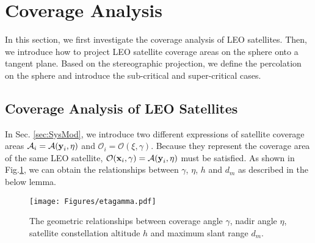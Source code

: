 \documentclass[final]{IEEEtran}
\begin{document}
\section{Coverage Analysis} \label{sec:coverage}
\indent In this section, we first investigate the coverage analysis of LEO satellites. Then, we introduce how to project LEO satellite coverage areas on the sphere onto a tangent plane. Based on the stereographic projection, we define the percolation on the sphere and introduce the sub-critical and super-critical cases.

\subsection{Coverage Analysis of LEO Satellites}
\indent In Sec. \ref{sec:SysMod}, we introduce two different expressions of satellite coverage areas $\mathcal{A}_i=\mathcal{A}(\textbf{y}_i,\eta)$ and $\mathcal{O}_i=\mathcal{O}(\xi,\gamma)$. Because they represent the coverage area of the same LEO satellite, $\mathcal{O}(\textbf{x}_i,\gamma)=\mathcal{A}(\textbf{y}_i,\eta)$ must be satisfied. As shown in Fig.\ref{fig:etagamma}, we can obtain the relationships between $\gamma$, $\eta$, $h$ and $d_m$ as described in the below lemma.
\begin{figure}
    \centering
    \texttt{[image: Figures/etagamma.pdf]}
    \caption{The geometric relationships between coverage angle $\gamma$, nadir angle $\eta$, satellite constellation altitude $h$ and maximum slant range $d_m$. }
    \label{fig:etagamma}
\end{figure}
\end{document}
